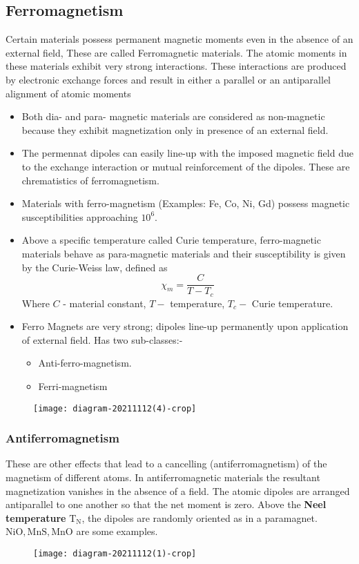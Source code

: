 \subsection{Ferromagnetism} 
Certain materials possess permanent magnetic moments even in the absence of an external field, These are called Ferromagnetic materials.
The atomic moments in these materials exhibit very strong interactions. These interactions are produced by electronic exchange forces and result in either a parallel or an antiparallel alignment of atomic moments 
\begin{itemize}
	\item  Both dia- and para- magnetic materials are considered as non-magnetic because they exhibit magnetization only in presence of an external field.
	
	\item  The permennat dipoles can easily line-up with the imposed magnetic field due to the exchange interaction or mutual reinforcement of the dipoles. These are chrematistics of ferromagnetism.
	\item  Materials with ferro-magnetism (Examples: Fe, Co, Ni, Gd) possess magnetic susceptibilities approaching $10^{6}$.
	\item  Above a specific temperature called Curie temperature, ferro-magnetic materials behave as para-magnetic materials and their susceptibility is given by the Curie-Weiss law, defined as
	$$
	\chi_{m}=\frac{C}{T-T_{c}}
	$$
	Where $C$ - material constant, $T-$ temperature, $T_{c}-$ Curie temperature.
	\item  Ferro Magnets are very strong; dipoles line-up permanently upon application of external field. Has two sub-classes:-
	\begin{itemize}
		\item Anti-ferro-magnetism.
		\item  Ferri-magnetism
	\end{itemize}
	
\end{itemize}
\begin{figure}[H]
	\centering
	\texttt{[image: diagram-20211112(4)-crop]}
	\caption{}
	\label{}
\end{figure}

 \subsubsection{Antiferromagnetism}
 These are other effects that lead to a cancelling (antiferromagnetism)  of the magnetism of different atoms. In antiferromagnetic materials the resultant magnetization vanishes in the absence of a field. The atomic dipoles are arranged antiparallel to one another so that the net moment is zero. Above the \textbf{Neel temperature} $\mathrm{T}_{\mathrm{N}}$, the dipoles are randomly oriented as in a paramagnet. $\mathrm{NiO}, \mathrm{MnS}, \mathrm{MnO}$ are some examples.
 \begin{figure}[H]
 	\centering
 	\texttt{[image: diagram-20211112(1)-crop]}
 	\caption{}
 	\label{}
 \end{figure}
